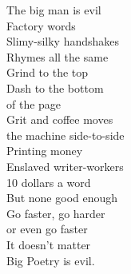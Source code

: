 The big man is evil\\
Factory words\\
Slimy-silky handshakes\\
Rhymes all the same\\
Grind to the top\\
Dash to the bottom\\
of the page\\
Grit and coffee moves\\
the machine side-to-side\\
Printing money\\
Enslaved writer-workers\\
10 dollars a word\\
But none good enough\\
Go faster, go harder\\
or even go faster\\
It doesn't matter\\
Big Poetry is evil.\\

